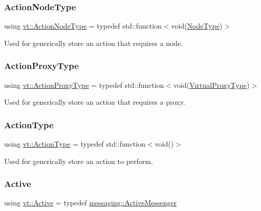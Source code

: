 \subsubsection{\texorpdfstring{Action\+Node\+Type}{ActionNodeType}}
{\footnotesize\ttfamily using \hyperlink{namespacevt_a0436cb2d620dcbb21b5b49cd9c9c4749}{vt\+::\+Action\+Node\+Type} = typedef std\+::function$<$void(\hyperlink{namespacevt_a866da9d0efc19c0a1ce79e9e492f47e2}{Node\+Type})$>$}



Used for generically store an action that requires a node. 

\mbox{\label{namespacevt_a102aa105d64254d89f7e585d106c95aa}} 
\subsubsection{\texorpdfstring{Action\+Proxy\+Type}{ActionProxyType}}
{\footnotesize\ttfamily using \hyperlink{namespacevt_a102aa105d64254d89f7e585d106c95aa}{vt\+::\+Action\+Proxy\+Type} = typedef std\+::function$<$void(\hyperlink{namespacevt_a1b417dd5d684f045bb58a0ede70045ac}{Virtual\+Proxy\+Type})$>$}



Used for generically store an action that requires a proxy. 

\mbox{\label{namespacevt_ae0a5a7b18cc99d7b732cb4d44f46b0f3}} 
\subsubsection{\texorpdfstring{Action\+Type}{ActionType}}
{\footnotesize\ttfamily using \hyperlink{namespacevt_ae0a5a7b18cc99d7b732cb4d44f46b0f3}{vt\+::\+Action\+Type} = typedef std\+::function$<$void()$>$}



Used for generically store an action to perform. 

\mbox{\label{namespacevt_ad548cc368cddb926753ac237eb454dae}} 
\subsubsection{\texorpdfstring{Active}{Active}}
{\footnotesize\ttfamily using \hyperlink{namespacevt_ad548cc368cddb926753ac237eb454dae}{vt\+::\+Active} = typedef \hyperlink{structvt_1_1messaging_1_1_active_messenger}{messaging\+::\+Active\+Messenger}}

